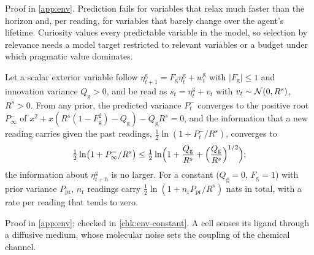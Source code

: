 Proof in \cref{app:env}. Prediction fails for variables that relax much faster than the horizon and, per reading, for variables that barely change over the agent's lifetime. Curiosity values every predictable variable in the model, so selection by relevance needs a model target restricted to relevant variables or a budget under which pragmatic value dominates.

\begin{lemma}\label{lem:env-constant}
Let a scalar exterior variable follow $\eta^{\mathrm g}_{t+1}=F_{\mathrm g}\eta^{\mathrm g}_t+w^{\mathrm g}_t$ with $\lvert F_{\mathrm g}\rvert\le1$ and innovation variance $Q_{\mathrm g}>0$, and be read as $s_t=\eta^{\mathrm g}_t+v_t$ with $v_t\sim\mathcal{N}(0,R^s)$, $R^s>0$. From any prior, the predicted variance $P^-_t$ converges to the positive root $P^-_\infty$ of $x^2+x(R^s(1-F_{\mathrm g}^2)-Q_{\mathrm g})-Q_{\mathrm g}R^s=0$, and the information that a new reading carries given the past readings, $\frac12\ln(1+P^-_t/R^s)$, converges to
\[
\tfrac12\ln\bigl(1+P^-_\infty/R^s\bigr)\le\tfrac12\ln\Bigl(1+\frac{Q_{\mathrm g}}{R^s}+\Bigl(\frac{Q_{\mathrm g}}{R^s}\Bigr)^{1/2}\Bigr);
\]
the information about $\eta^{\mathrm g}_{t+h}$ is no larger. For a constant ($Q_{\mathrm g}=0$, $F_{\mathrm g}=1$) with prior variance $P_{\mathrm{pr}}$, $n_{\mathrm r}$ readings carry $\frac12\ln(1+n_{\mathrm r}P_{\mathrm{pr}}/R^s)$ nats in total, with a rate per reading that tends to zero.
\end{lemma}

Proof in \cref{app:env}; checked in \cref{chk:env-constant}. A cell senses its ligand through a diffusive medium, whose molecular noise sets the coupling of the chemical channel.

